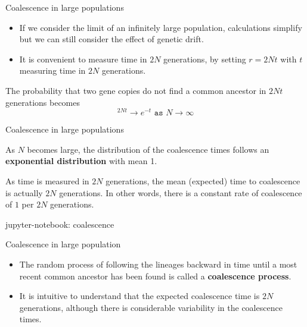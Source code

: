 \begin{frame}{Coalescence in large populations}

	\begin{itemize}
		\item If we consider the limit of an infinitely large population, calculations 
		simplify but we can still 
		consider the effect of genetic drift.
		\item It is convenient to measure time in $2N$ generations, by setting $r=2Nt$ with $t$ measuring time in $2N$ generations.
	\end{itemize}

	\pause
	The probability that two gene copies do not find a common ancestor in $2Nt$ generations becomes
	\begin{equation*}
		[1-1/(2N)]^{2Nt} \rightarrow e^{-t} \texttt{ as } N \rightarrow \infty
	\end{equation*}


\end{frame}


\begin{frame}{Coalescence in large populations}

	As $N$ becomes large, the distribution of the coalescence times follows an \textbf{exponential distribution} with mean 1.

	\bigskip

	As time is measured in $2N$ generations, the mean (expected) time to coalescence is actually $2N$ generations.
	In other words, there is a constant rate of coalescence of $1$ per $2N$ generations.
	
	\bigskip
	\tiny
        jupyter-notebook: coalescence

\end{frame}


\begin{frame}{Coalescence in large population}

	\begin{itemize}
		\item The random process of following the lineages backward in time until a most recent common ancestor
		has been found is called a \textbf{coalescence process}.
		\item It is intuitive to understand that the expected coalescence time is $2N$ generations, although
		there is considerable variability in the coalescence times.
	\end{itemize}

\end{frame}



